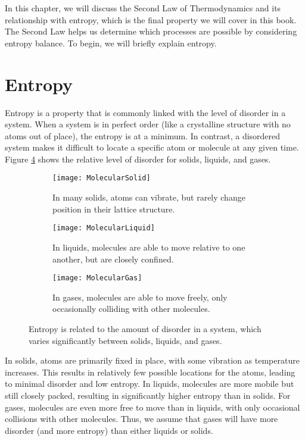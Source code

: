 In this chapter, we will discuss the Second Law of Thermodynamics and its relationship with entropy, which is the final property we will cover in this book. The Second Law helps us determine which processes are possible by considering entropy balance. To begin, we will briefly explain entropy.

\section{Entropy}

Entropy is a property that is commonly linked with the level of disorder in a system. When a system is in perfect order (like a crystalline structure with no atoms out of place), the entropy is at a minimum. In contrast, a disordered system makes it difficult to locate a specific atom or molecule at any given time.  Figure \ref{fig:molecularEntropy} shows the relative level of disorder for solids, liquids, and gases.

\begin{figure}[H]
\centering
\begin{subfigure}{.3\textwidth}
  \centering
  \texttt{[image: MolecularSolid]}
  \caption{In many solids, atoms can vibrate, but rarely change position in their lattice structure.}
  \label{fig:molecularSolid}
\end{subfigure}\hfill
\begin{subfigure}{.3\textwidth}
  \centering
  \texttt{[image: MolecularLiquid]}
  \caption{In liquids, molecules are able to move relative to one another, but are closely confined.}
  \label{fig:molecularLiquid}
\end{subfigure}\hfill
\begin{subfigure}{.3\textwidth}
  \centering
  \texttt{[image: MolecularGas]}
  \caption{In gases, molecules are able to move freely, only occasionally colliding with other molecules.}
  \label{fig:molecularGas}
\end{subfigure}
\caption{Entropy is related to the amount of disorder in a system, which varies significantly between solids, liquids, and gases.}
\label{fig:molecularEntropy}
\end{figure}

In solids, atoms are primarily fixed in place, with some vibration as temperature increases. This results in relatively few possible locations for the atoms, leading to minimal disorder and low entropy. In liquids, molecules are more mobile but still closely packed, resulting in significantly higher entropy than in solids.  For gases, molecules are even more free to move than in liquids, with only occasional collisions with other molecules.  Thus, we assume that gases will have more disorder (and more entropy) than either liquids or solids.

